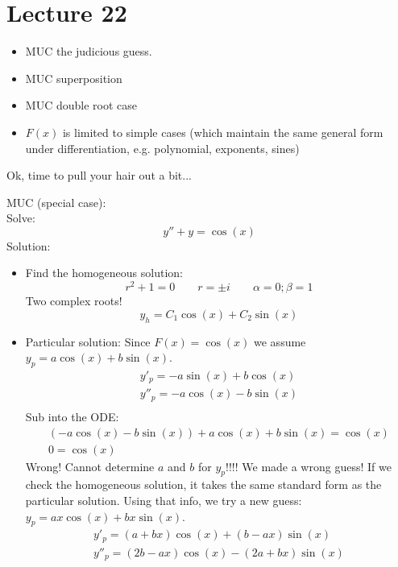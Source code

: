 \chapter*{Lecture 22}
\begin{recall}{}{}
\begin{itemize}
\item MUC the judicious guess.
\item MUC superposition
\item MUC double root case
\item  $F(x)$ is limited to simple cases (which maintain the same general form under differentiation, e.g. polynomial, exponents, sines)
\end{itemize}
\end{recall}


Ok, time to pull your hair out a bit...
\begin{exmp}{MUC (special case):}\\
Solve:
\begin{equation*}
y''+y=\cos(x)
\end{equation*}
Solution:
\begin{itemize}
\item Find the homogeneous solution:\\
\begin{equation*}
r^2+1=0 \qquad r=\pm i \qquad \alpha=0; \beta=1
\end{equation*}
Two complex roots!
\begin{equation*}
\boxed{y_h=C_1 \cos(x)+C_2 \sin(x)}
\end{equation*}
\item Particular solution: Since $F(x)=\cos(x)$ we assume $y_p=a\cos(x)+b\sin(x)$.
\begin{align*}
y'_p=-a\sin(x)+b\cos(x)\\
y''_p=-a\cos(x)-b\sin(x)\\
\end{align*}
Sub into the ODE:
\begin{align*}
(-a\cos(x)-b\sin(x))+a\cos(x)+b\sin(x)=\cos(x)\\
0 = \cos(x)
\end{align*}
Wrong! Cannot determine $a$ and $b$ for $y_p$!!!!
We made a wrong guess!
If we check the homogeneous solution, it takes the same standard form as the particular solution. Using that info, we try a new guess: $y_p=ax\cos(x)+bx\sin(x)$.
\begin{align*}
y'_p=(a+bx)\cos(x)+(b-ax)\sin(x)\\
y''_p=(2b-ax)\cos(x)-(2a+bx)\sin(x)

\end{align*}
\end{itemize}
\end{exmp}
